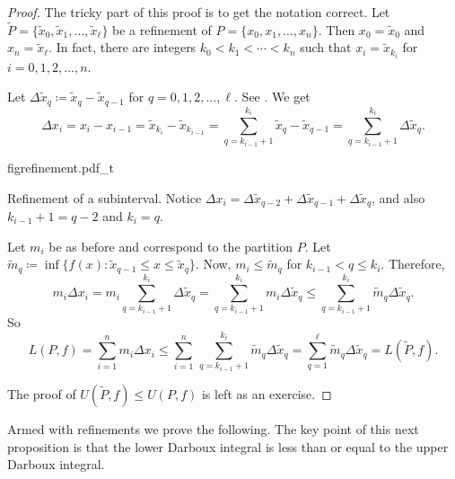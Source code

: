 \begin{proof}
The tricky part of this proof is to get the notation correct.
Let $\widetilde{P} = \{ \widetilde{x}_0, \widetilde{x}_1, \ldots,
\widetilde{x}_{\ell} \}$ be
a refinement of 
$P = \{ x_0, x_1, \ldots, x_n \}$.  Then
$x_0 = \widetilde{x}_0$ and 
$x_n = \widetilde{x}_{\ell}$.  In fact, there are integers
$k_0 < k_1 < \cdots < k_n$ such that $x_i = \widetilde{x}_{k_i}$ for
$i=0,1,2,\ldots,n$.

Let $\Delta \widetilde{x}_q \coloneqq \widetilde{x}_q - \widetilde{x}_{q-1}$ for
$q=0,1,2,\ldots,\ell$.
See .
We get 
\begin{equation*}
\Delta x_i
=
x_i - x_{i-1} =
\widetilde{x}_{k_i} - \widetilde{x}_{k_{i-1}} =
\sum_{q=k_{i-1}+1}^{k_i} 
\widetilde{x}_{q} - \widetilde{x}_{q-1}
=
\sum_{q=k_{i-1}+1}^{k_i} \Delta \widetilde{x}_q .
\end{equation*}
\begin{myfigureht}
{figrefinement.pdf_t}
\caption{Refinement of a subinterval.  Notice $\Delta x_i =
\Delta \widetilde{x}_{q-2} +
\Delta \widetilde{x}_{q-1} +
\Delta \widetilde{x}_{q}$,
and also
$k_{i-1}+1 = q-2$ and
$k_{i} = q$.\label{fig:refinement}}
\end{myfigureht}

Let $m_i$ be as before and correspond to the partition $P$.
Let $\widetilde{m}_q \coloneqq \inf \bigl\{ f(x) : \widetilde{x}_{q-1} \leq x \leq
\widetilde{x}_q \bigr\}$.
Now, $m_i \leq \widetilde{m}_q$ for $k_{i-1} < q \leq k_i$.  Therefore,
\begin{equation*}
m_i \Delta x_i
=
m_i \sum_{q=k_{i-1}+1}^{k_i} \Delta \widetilde{x}_q
=
\sum_{q=k_{i-1}+1}^{k_i} m_i \Delta \widetilde{x}_q
\leq
\sum_{q=k_{i-1}+1}^{k_i} \widetilde{m}_q \Delta \widetilde{x}_q .
\end{equation*}
So
\begin{equation*}
L(P,f) =
\sum_{i=1}^n m_i \Delta x_i
\leq
\sum_{i=1}^n \,
\sum_{q=k_{i-1}+1}^{k_i} \widetilde{m}_q \Delta \widetilde{x}_q
=
\sum_{q=1}^{\ell}
\widetilde{m}_q \Delta \widetilde{x}_q = L(\widetilde{P},f).
\end{equation*}

The proof of $U(\widetilde{P},f) \leq U(P,f)$ is left as an exercise.
\end{proof}

Armed with refinements we prove the following.
The key point of this next proposition is that
the lower Darboux integral is less than or equal to the upper Darboux
integral.

